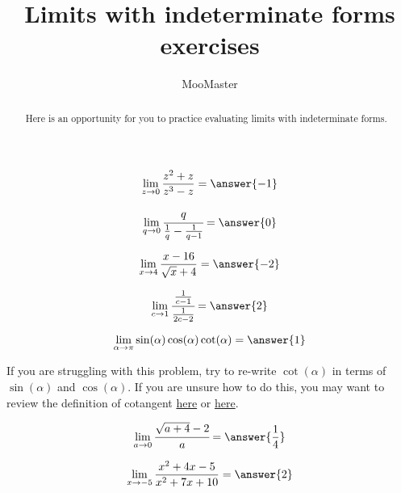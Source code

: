 \documentclass[handout]{ximera}
\title{Limits with indeterminate forms exercises}
\author{MooMaster}
\begin{document}
\begin{abstract}
Here is an opportunity for you to practice evaluating limits with indeterminate forms. 
\end{abstract}
\maketitle

\begin{exercise}
\[\lim_{z \to 0} \frac{z^2+z}{z^3-z} = \answer{-1}\]
\end{exercise}

\begin{exercise}
\[\lim_{q \to 0} \cfrac{q}{\frac{1}{q} - \frac{1}{q-1}} = \answer{0}\]
\end{exercise}

\begin{exercise}
\[\lim_{x \to 4} \frac{x-16}{\sqrt{x} + 4} = \answer{-2}\]
\end{exercise}

\begin{exercise}
\[\lim_{c \to 1} \cfrac{\frac{1}{c-1}}{\frac{1}{2c-2}} = \answer{2}\]
\end{exercise}

\begin{exercise}
\[\lim_{\alpha \to \pi} \sin(\alpha) \cos(\alpha) \cot(\alpha) = \answer{1}\]

\begin{hint}

If you are struggling with this problem, try to re-write $\cot(\alpha)$ in terms of $\sin(\alpha)$ and $\cos(\alpha)$.  If you are unsure how to do this, you may want to review the definition of cotangent \href{https://ximera.osu.edu/math160fa17/m160prerequisites/prerequisiteVideos/trigUnitCircle}{here} or \href{https://ximera.osu.edu/math160fa17/m160prerequisites/reviewOfFamousFunctions/digInTrigonometricFunctions}{here}.

\end{hint}

\end{exercise}

\begin{exercise}
\[\lim_{a \to 0} \cfrac{\sqrt{a+4} -2}{a} = \answer{\frac{1}{4}}\]
\end{exercise}

\begin{exercise}
\[\lim_{x \to -5} \frac{x^2 + 4x -5}{x^2 + 7x + 10} = \answer{2}\]
\end{exercise}
\end{document}
